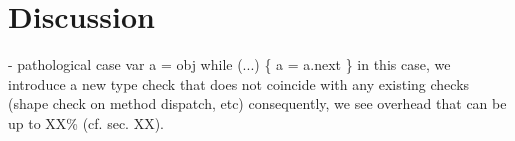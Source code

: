 
\section{Discussion}

\begin{cnote}
- pathological case
  var a = obj
  while (...) \{
    a = a.next
  \}
  in this case, we introduce a new type check that does not coincide with any
  existing checks (shape check on method dispatch, etc)
  consequently, we see overhead that can be up to XX\% (cf. sec. XX).
\end{cnote}

